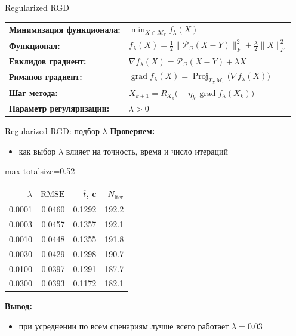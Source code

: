 \documentclass[aspectratio=169,xcolor=dvipsnames]{beamer}
\begin{document}
\begin{frame}{Regularized RGD}
\footnotesize
\renewcommand{\arraystretch}{1.22}
\begin{center}
\begin{tabular}{@{}>{\raggedright\arraybackslash\bfseries}p{}p{}@{}}
Минимизация функционала: &
$\displaystyle \min_{X\in \mathcal M_r} f_{\lambda}(X)$
\\
Функционал: &
$\displaystyle f_{\lambda}(X)=\frac12\lVert \mathcal P_{\Omega}(X-Y)\rVert_F^2+\frac{\lambda}{2}\lVert X\rVert_F^2$
\\
Евклидов градиент: &
$\displaystyle \nabla f_{\lambda}(X)=\mathcal P_{\Omega}(X-Y)+\lambda X$
\\
Риманов градиент: &
$\displaystyle \operatorname{grad} f_{\lambda}(X)=\operatorname{Proj}_{T_X\mathcal M_r}\bigl(\nabla f_{\lambda}(X)\bigr)$
\\
Шаг метода: &
$\displaystyle X_{k+1}=R_{X_k}\bigl(-\eta_k\,\operatorname{grad} f_{\lambda}(X_k)\bigr)$
\\
Параметр регуляризации: &
$\displaystyle \lambda > 0$
\end{tabular}
\end{center}
\end{frame}

\begin{frame}{Regularized RGD: подбор $\lambda$}
\scriptsize
\textbf{Проверяем:}
\begin{itemize}
\item как выбор $\lambda$ влияет на точность, время и число итераций
\end{itemize}

\begin{center}
\begin{adjustbox}{max totalsize={\textwidth}{0.52\textheight}}
\begin{tabular}{rrrr}
\toprule
$\lambda$ & $\overline{\mathrm{RMSE}}$ & $\overline{t}$, c & $\overline{N}_{\mathrm{iter}}$ \\
\midrule
0.0001 & 0.0460 & 0.1292 & 192.2 \\
0.0003 & 0.0457 & 0.1357 & 192.1 \\
0.0010 & 0.0448 & 0.1355 & 191.8 \\
0.0030 & 0.0429 & 0.1298 & 190.7 \\
0.0100 & 0.0397 & 0.1291 & 187.7 \\
\textcolor{green!50!black}{0.0300} & \textcolor{green!50!black}{0.0393} & \textcolor{green!50!black}{0.1172} & \textcolor{green!50!black}{182.1} \\
\bottomrule
\end{tabular}
\end{adjustbox}
\end{center}

\textbf{Вывод:}
\begin{itemize}
\item при усреднении по всем сценариям лучше всего работает $\lambda = 0.03$
\end{itemize}
\end{frame}
\end{document}
